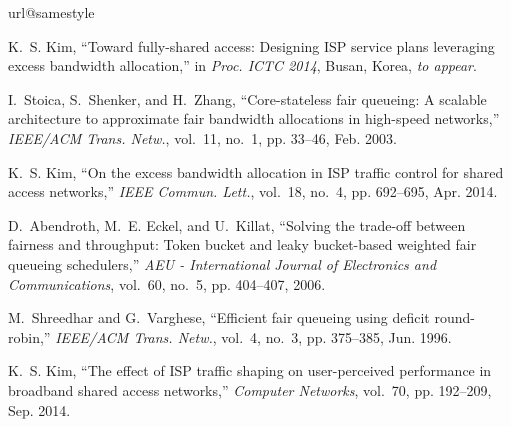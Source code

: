 \documentclass[conference,twoside,final]{IEEEtran}
\begin{document}
\begin{thebibliography}{1}
\providecommand{\url}[1]{#1}
\csname url@samestyle\endcsname
\providecommand{\newblock}{\relax}
\providecommand{\bibinfo}[2]{#2}
\providecommand{\BIBentrySTDinterwordspacing}{\spaceskip=0pt\relax}
\providecommand{\BIBentryALTinterwordstretchfactor}{4}
\providecommand{\BIBentryALTinterwordspacing}{\spaceskip=\fontdimen2\font plus
\BIBentryALTinterwordstretchfactor\fontdimen3\font minus
  \fontdimen4\font\relax}
\providecommand{\BIBforeignlanguage}[2]{{\expandafter\ifx\csname l@#1\endcsname\relax
\typeout{** WARNING: IEEEtran.bst: No hyphenation pattern has been}\typeout{** loaded for the language `#1'. Using the pattern for}\typeout{** the default language instead.}\else
\language=\csname l@#1\endcsname
\fi
#2}}
\providecommand{\BIBdecl}{\relax}
\BIBdecl

K.~S. Kim, ``Toward fully-shared access: Designing {ISP} service plans
  leveraging excess bandwidth allocation,'' in \emph{Proc. {ICTC} 2014}, Busan,
  Korea, \textit{to appear}.

I.~Stoica, S.~Shenker, and H.~Zhang, ``Core-stateless fair queueing: A scalable
  architecture to approximate fair bandwidth allocations in high-speed
  networks,'' \emph{{IEEE/ACM} Trans. Netw.}, vol.~11, no.~1, pp. 33--46, Feb.
  2003.

K.~S. Kim, ``On the excess bandwidth allocation in {ISP} traffic control for
  shared access networks,'' \emph{{IEEE} Commun. Lett.}, vol.~18, no.~4, pp.
  692--695, Apr. 2014.

D.~Abendroth, M.~E. Eckel, and U.~Killat, ``Solving the trade-off between
  fairness and throughput: Token bucket and leaky bucket-based weighted fair
  queueing schedulers,'' \emph{{AEU} - International Journal of Electronics and
  Communications}, vol.~60, no.~5, pp. 404--407, 2006.

M.~Shreedhar and G.~Varghese, ``Efficient fair queueing using deficit
  round-robin,'' \emph{{IEEE/ACM} Trans. Netw.}, vol.~4, no.~3, pp. 375--385,
  Jun. 1996.

K.~S. Kim, ``The effect of {ISP} traffic shaping on user-perceived performance
  in broadband shared access networks,'' \emph{Computer Networks}, vol.~70, pp.
  192--209, Sep. 2014.

\end{thebibliography}
\end{document}
